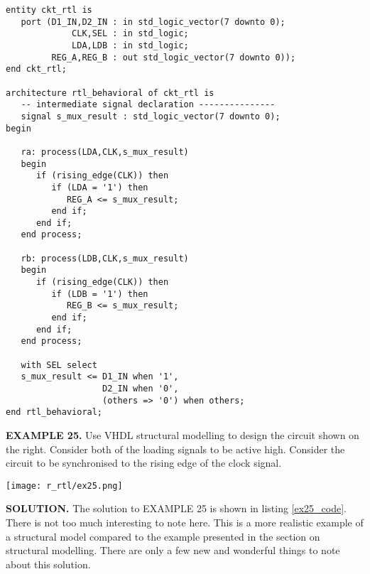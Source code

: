 \begin{lstlisting}[label=ex24_code, caption=Solution to EXAMPLE 24.]
entity ckt_rtl is
   port (D1_IN,D2_IN : in std_logic_vector(7 downto 0);
             CLK,SEL : in std_logic; 
             LDA,LDB : in std_logic; 
         REG_A,REG_B : out std_logic_vector(7 downto 0)); 
end ckt_rtl; 

architecture rtl_behavioral of ckt_rtl is 
   -- intermediate signal declaration ---------------
   signal s_mux_result : std_logic_vector(7 downto 0);
begin

   ra: process(LDA,CLK,s_mux_result)
   begin
      if (rising_edge(CLK)) then 
         if (LDA = '1') then 
            REG_A <= s_mux_result; 
         end if;
      end if;
   end process; 
	
   rb: process(LDB,CLK,s_mux_result)
   begin
      if (rising_edge(CLK)) then 
         if (LDB = '1') then 
            REG_B <= s_mux_result; 
         end if;
      end if;
   end process; 
	
   with SEL select
   s_mux_result <= D1_IN when '1', 
                   D2_IN when '0', 
                   (others => '0') when others; 
end rtl_behavioral;
\end{lstlisting}

\begin{leftbar}
\begin{minipage}[t]{0.5\textwidth}
\vspace{10pt}
\noindent
\textbf{EXAMPLE 25.}
Use VHDL structural modelling to design the circuit shown on the right. Consider both of the loading signals to be active high. Consider the circuit to be synchronised to the rising edge of the clock signal.
\end{minipage}
\begin{minipage}[t]{0.5\textwidth}
\vspace{0pt}\raggedright
    \centering
	\texttt{[image: r\_rtl/ex25.png]}
\end{minipage}
\end{leftbar}
\noindent
\textbf{SOLUTION.} The solution to EXAMPLE 25 is shown in listing \ref{ex25_code}. There is not too much interesting to note here. This is a more realistic example of a structural model compared to the example presented in the section on structural modelling. There are only a few new and wonderful things to note about this solution.


